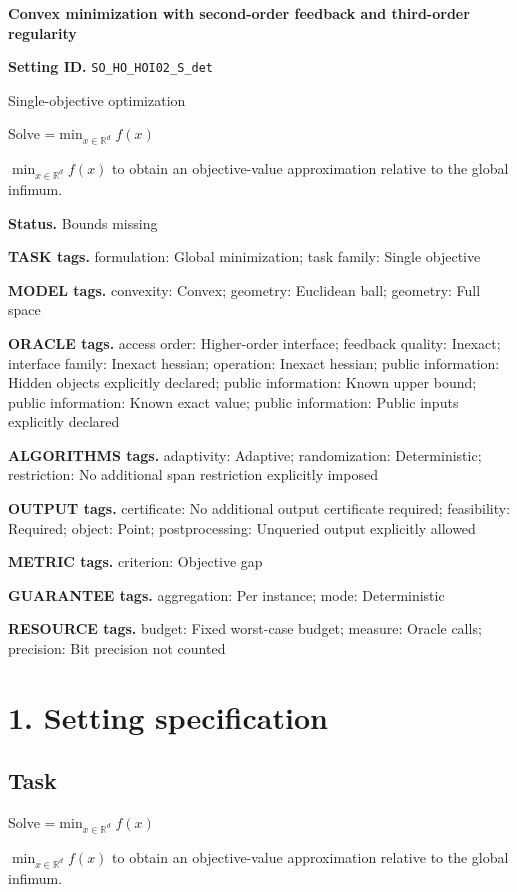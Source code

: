 \documentclass[10pt,a4paper]{article}
\newcommand{\AtlasMath}[1]{\par\begingroup\centering\setbox0=\hbox{$\displaystyle #1$}\ifdim\wd0>1.4\linewidth\typeout{ATLAS WIDE FORMULA: \the\wd0}\fi\ifdim\wd0>\linewidth\resizebox{\linewidth}{!}{\box0}\else\box0\fi\par\endgroup}
\newcommand{\AtlasInlineMath}[1]{\begingroup\setbox0=\hbox{$#1$}\ifdim\wd0>.4\linewidth\endgroup\AtlasMath{#1}\else\endgroup$#1$\fi}
\begin{document}
\raggedright

{\LARGE\bfseries\sffamily\color{AtlasNavy} Convex minimization with second-order feedback and third-order regularity\par}\vspace{5pt}
\textbf{Setting ID.} \texttt{SO\_\allowbreak{}HO\_\allowbreak{}HOI02\_\allowbreak{}S\_\allowbreak{}det}

Single-objective optimization

Solve \AtlasInlineMath{\min_{x\in \mathbb{R}^d}f(x)} to obtain an objective-value approximation relative to the global infimum.

\textbf{Status.} Bounds missing

\textbf{TASK tags.} formulation: Global minimization; task family: Single objective

\textbf{MODEL tags.} convexity: Convex; geometry: Euclidean ball; geometry: Full space

\textbf{ORACLE tags.} access order: Higher-order interface; feedback quality: Inexact; interface family: Inexact hessian; operation: Inexact hessian; public information: Hidden objects explicitly declared; public information: Known upper bound; public information: Known exact value; public information: Public inputs explicitly declared

\textbf{ALGORITHMS tags.} adaptivity: Adaptive; randomization: Deterministic; restriction: No additional span restriction explicitly imposed

\textbf{OUTPUT tags.} certificate: No additional output certificate required; feasibility: Required; object: Point; postprocessing: Unqueried output explicitly allowed

\textbf{METRIC tags.} criterion: Objective gap

\textbf{GUARANTEE tags.} aggregation: Per instance; mode: Deterministic

\textbf{RESOURCE tags.} budget: Fixed worst-case budget; measure: Oracle calls; precision: Bit precision not counted

\section{1. Setting specification}
\subsection{Task}
Solve \AtlasInlineMath{\min_{x\in \mathbb{R}^d}f(x)} to obtain an objective-value approximation relative to the global infimum.
\end{document}
